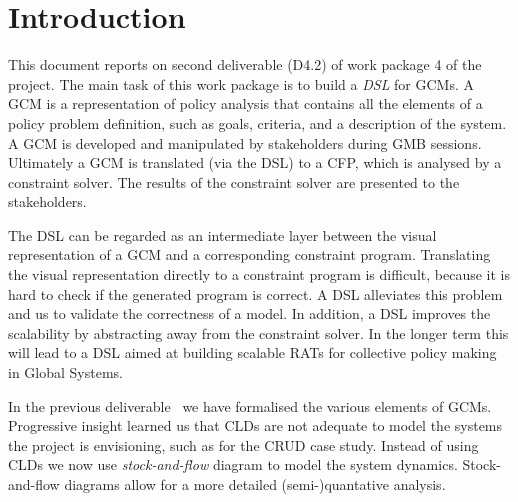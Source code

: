 \section{Introduction}\label{introduction}





This document reports on second deliverable (D4.2) of work package 4 of the
\grace project. The main task of this work package is to build a \emph{\ac{DSL}}
for \acp{GCM}. A \ac{GCM} is a representation of policy analysis that contains
all the elements of a policy problem definition, such as goals, criteria, and
a description of the system. A \ac{GCM} is developed and manipulated by
stakeholders during \ac{GMB} sessions. Ultimately a \ac{GCM} is translated
(via the \ac{DSL}) to a \ac{CFP}, which is analysed by a constraint solver. The
results of the constraint solver are presented to the stakeholders.

The \ac{DSL} can be regarded as an intermediate layer between the visual
representation of a \acf{GCM} and a corresponding constraint program.
Translating the visual representation directly to a constraint program is
difficult, because it is hard to check if the generated program is correct. A
DSL alleviates this problem and us to validate the correctness of a model. In
addition, a \ac{DSL} improves the scalability by abstracting away from the
constraint solver. In the longer term this will lead to a \ac{DSL} aimed at
building scalable \acp{RAT} for collective policy making in Global Systems.  


In the previous deliverable~\cite{d4.1} we have formalised the various elements
of \acp{GCM}. Progressive insight learned us that \acp{CLD} are not
adequate to model the systems the project is envisioning, such as for the \ac{CRUD}
case study. Instead of using \aclp{CLD} we now use
\emph{stock-and-flow} diagram to model the system dynamics. Stock-and-flow
diagrams allow for a more detailed (semi-)quantative analysis.



